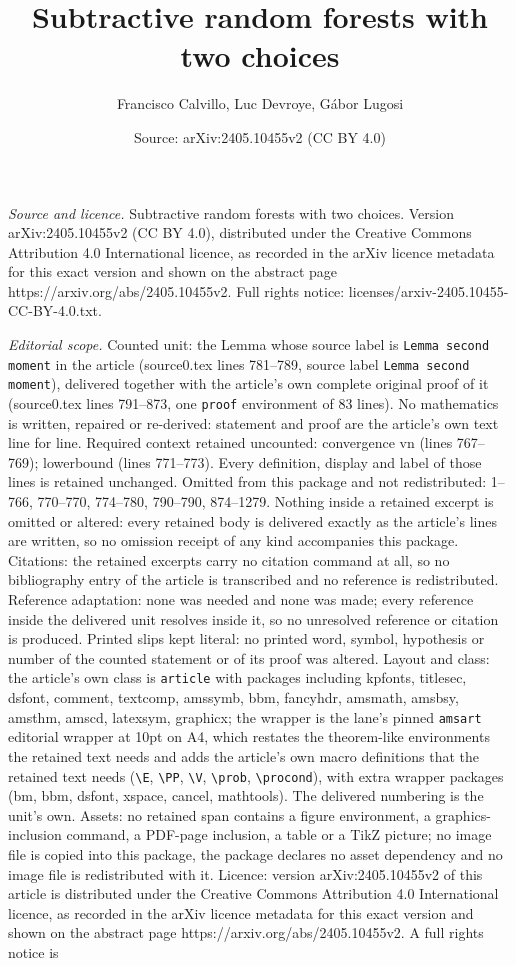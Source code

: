 \documentclass[10pt,a4paper]{amsart}
\title[Subtractive random forests with two choices]{Subtractive random forests with two choices}
\author{Francisco Calvillo, Luc Devroye, G\'abor Lugosi}
\date{Source: arXiv:2405.10455v2 (CC BY 4.0)}
\begin{document}
\maketitle

\noindent\emph{Source and licence.} Subtractive random forests with two choices. Version arXiv:2405.10455v2 (CC BY 4.0), distributed under the Creative Commons Attribution 4.0 International licence, as recorded in the arXiv licence metadata for this exact version and shown on the abstract page https://arxiv.org/abs/2405.10455v2. Full rights notice: licenses/arxiv-2405.10455-CC-BY-4.0.txt.\par\smallskip

\noindent\textit{Editorial scope.} Counted unit: the Lemma whose source label is \texttt{Lemma second moment} in the article (source0.tex lines 781--789, source label \texttt{Lemma second moment}), delivered together with the article's own complete original proof of it (source0.tex lines 791--873, one \texttt{proof} environment of 83 lines). No mathematics is written, repaired or re-derived: statement and proof are the article's own text line for line. Required context retained uncounted: convergence vn (lines 767--769); lowerbound (lines 771--773). Every definition, display and label of those lines is retained unchanged. Omitted from this package and not redistributed: 1--766, 770--770, 774--780, 790--790, 874--1279. Nothing inside a retained excerpt is omitted or altered: every retained body is delivered exactly as the article's lines are written, so no omission receipt of any kind accompanies this package. Citations: the retained excerpts carry no citation command at all, so no bibliography entry of the article is transcribed and no reference is redistributed. Reference adaptation: none was needed and none was made; every reference inside the delivered unit resolves inside it, so no unresolved reference or citation is produced. Printed slips kept literal: no printed word, symbol, hypothesis or number of the counted statement or of its proof was altered. Layout and class: the article's own class is \texttt{article} with packages including kpfonts, titlesec, dsfont, comment, textcomp, amssymb, bbm, fancyhdr, amsmath, amsbsy, amsthm, amscd, latexsym, graphicx; the wrapper is the lane's pinned \texttt{amsart} editorial wrapper at 10pt on A4, which restates the theorem-like environments the retained text needs and adds the article's own macro definitions that the retained text needs (\texttt{\textbackslash E}, \texttt{\textbackslash PP}, \texttt{\textbackslash V}, \texttt{\textbackslash prob}, \texttt{\textbackslash procond}), with extra wrapper packages (bm, bbm, dsfont, xspace, cancel, mathtools). The delivered numbering is the unit's own. Assets: no retained span contains a figure environment, a graphics-inclusion command, a PDF-page inclusion, a table or a TikZ picture; no image file is copied into this package, the package declares no asset dependency and no image file is redistributed with it. Licence: version arXiv:2405.10455v2 of this article is distributed under the Creative Commons Attribution 4.0 International licence, as recorded in the arXiv licence metadata for this exact version and shown on the abstract page https://arxiv.org/abs/2405.10455v2. A full rights notice is 
\end{document}
